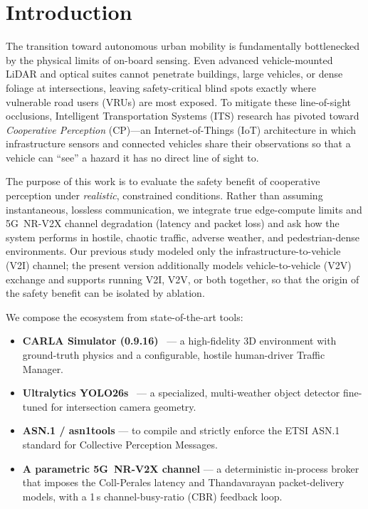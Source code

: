 \documentclass[11pt]{article}
\begin{document}
\section{Introduction}
The transition toward autonomous urban mobility is fundamentally bottlenecked by
the physical limits of on-board sensing. Even advanced vehicle-mounted LiDAR and
optical suites cannot penetrate buildings, large vehicles, or dense foliage at
intersections, leaving safety-critical blind spots exactly where vulnerable road
users (VRUs) are most exposed. To mitigate these line-of-sight occlusions,
Intelligent Transportation Systems (ITS) research has pivoted toward
\emph{Cooperative Perception} (CP)---an Internet-of-Things (IoT) architecture in
which infrastructure sensors and connected vehicles share their observations so
that a vehicle can ``see'' a hazard it has no direct line of sight to.

The purpose of this work is to evaluate the safety benefit of cooperative
perception under \emph{realistic}, constrained conditions. Rather than assuming
instantaneous, lossless communication, we integrate true edge-compute limits and
5G~NR-V2X channel degradation (latency and packet loss) and ask how the system
performs in hostile, chaotic traffic, adverse weather, and pedestrian-dense
environments. Our previous study modeled only the infrastructure-to-vehicle (V2I)
channel; the present version additionally models vehicle-to-vehicle (V2V)
exchange and supports running V2I, V2V, or both together, so that the origin of
the safety benefit can be isolated by ablation.

We compose the ecosystem from state-of-the-art tools:
\begin{itemize}[leftmargin=1.3em,itemsep=0.15em,topsep=0.2em]
  \item \textbf{CARLA Simulator (0.9.16)}~\cite{carla2017} --- a high-fidelity 3D
  environment with ground-truth physics and a configurable, hostile human-driver
  Traffic Manager.
  \item \textbf{Ultralytics YOLO26s}~\cite{ultralytics2024} --- a specialized,
  multi-weather object detector fine-tuned for intersection camera geometry.
  \item \textbf{ASN.1 / asn1tools} --- to compile and strictly enforce the ETSI
  ASN.1 standard for Collective Perception Messages.
  \item \textbf{A parametric 5G~NR-V2X channel} --- a deterministic in-process
  broker that imposes the Coll-Perales latency and Thandavarayan packet-delivery
  models, with a 1\,s channel-busy-ratio (CBR) feedback loop.
\end{itemize}
\end{document}
